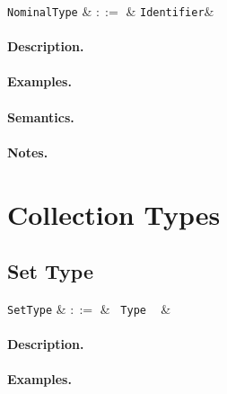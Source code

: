 \begin{syntax}
  \verb+NominalType+ & $::=$ & \verb+Identifier+&\\
\end{syntax}

\paragraph{Description.}

\paragraph{Examples.}

\paragraph{Semantics.}

\paragraph{Notes.}


\section{Collection Types}


\subsection{Set Type}

\begin{syntax}
  \verb+SetType+ & $::=$ & \token{\{} \ \verb+Type+ \ \token{\}} &\\
\end{syntax}

\paragraph{Description.}

\paragraph{Examples.}

